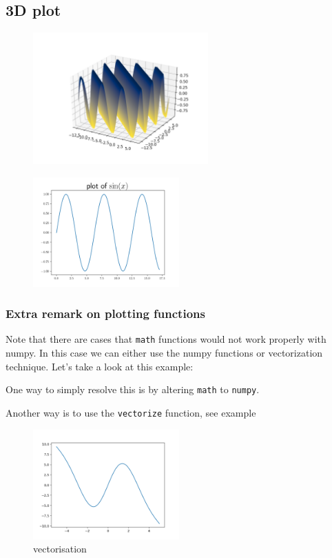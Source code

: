 \documentclass[10pt,a4paper]{article}
\newcommand{\te}{\texttt}
\begin{document}
\subsection{3D plot}

\begin{figure}[h]\centering
\includegraphics[width=0.6\textwidth]{3dplot.png}
\end{figure}
\begin{figure}[h]\centering
\includegraphics[width=0.5\textwidth]{sin.png}
\end{figure}
\subsubsection{Extra remark on plotting functions}
Note that there are cases that \te{math} functions would not work properly with numpy. In this case we can either use the numpy functions or vectorization technique. 
Let's take a look at this example:

One way to simply resolve this is by altering \te{math} to \te{numpy}.

Another way is to use the \te{vectorize} function, see example

\begin{figure}[h]\centering
\caption{vectorisation}
\includegraphics[width=0.5\textwidth]{vectorisation.png}
\end{figure}
\end{document}
